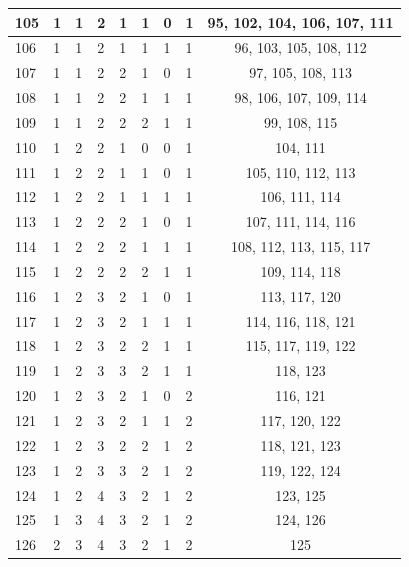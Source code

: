 \begin{longtable}{|l|l|l|l|l|l|l|l|c|}
105 & 1 & 1 & 2 & 1 & 1 & 0 & 1 & 95, 102, 104, 106, 107, 111 \\ \hline
106 & 1 & 1 & 2 & 1 & 1 & 1 & 1 & 96, 103, 105, 108, 112 \\ \hline
107 & 1 & 1 & 2 & 2 & 1 & 0 & 1 & 97, 105, 108, 113 \\ \hline
108 & 1 & 1 & 2 & 2 & 1 & 1 & 1 & 98, 106, 107, 109, 114 \\ \hline
109 & 1 & 1 & 2 & 2 & 2 & 1 & 1 & 99, 108, 115 \\ \hline
110 & 1 & 2 & 2 & 1 & 0 & 0 & 1 & 104, 111 \\ \hline
111 & 1 & 2 & 2 & 1 & 1 & 0 & 1 & 105, 110, 112, 113 \\ \hline
112 & 1 & 2 & 2 & 1 & 1 & 1 & 1 & 106, 111, 114 \\ \hline
113 & 1 & 2 & 2 & 2 & 1 & 0 & 1 & 107, 111, 114, 116 \\ \hline
114 & 1 & 2 & 2 & 2 & 1 & 1 & 1 & 108, 112, 113, 115, 117 \\ \hline
115 & 1 & 2 & 2 & 2 & 2 & 1 & 1 & 109, 114, 118 \\ \hline
116 & 1 & 2 & 3 & 2 & 1 & 0 & 1 & 113, 117, 120 \\ \hline
117 & 1 & 2 & 3 & 2 & 1 & 1 & 1 & 114, 116, 118, 121 \\ \hline
118 & 1 & 2 & 3 & 2 & 2 & 1 & 1 & 115, 117, 119, 122 \\ \hline
119 & 1 & 2 & 3 & 3 & 2 & 1 & 1 & 118, 123 \\ \hline
120 & 1 & 2 & 3 & 2 & 1 & 0 & 2 & 116, 121 \\ \hline
121 & 1 & 2 & 3 & 2 & 1 & 1 & 2 & 117, 120, 122 \\ \hline
122 & 1 & 2 & 3 & 2 & 2 & 1 & 2 & 118, 121, 123 \\ \hline
123 & 1 & 2 & 3 & 3 & 2 & 1 & 2 & 119, 122, 124 \\ \hline
124 & 1 & 2 & 4 & 3 & 2 & 1 & 2 & 123, 125 \\ \hline
125 & 1 & 3 & 4 & 3 & 2 & 1 & 2 & 124, 126 \\ \hline
126 & 2 & 3 & 4 & 3 & 2 & 1 & 2 & 125 \\ \hline
\end{longtable}


